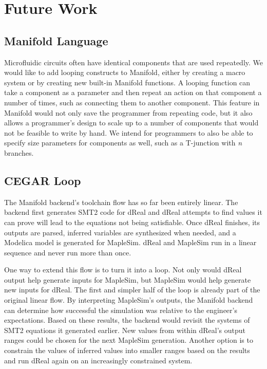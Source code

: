 \section{Future Work}

\subsection{Manifold Language}

Microfluidic circuits often have identical components that are used repeatedly.
We would like to add looping constructs to Manifold, either by creating a
macro system or by creating new built-in Manifold functions. A looping function
can take a component as a parameter and then repeat an action on that
component a number of times, such as connecting them to another component.
This feature in Manifold would not only save the programmer from repeating
code, but it also allows a programmer's design to scale up to a number of
components that would not be feasible to write by hand. We intend for
programmers to also be able to specify size parameters for components as
well, such as a T-junction with \emph{n} branches.

\subsection{CEGAR Loop}

The Manifold backend's toolchain flow has so far been entirely linear.
The backend first generates SMT2 code for dReal and dReal attempts to find values it can prove will lead to the equations not being satisfiable.
Once dReal finishes, its outputs are parsed, inferred variables are synthesized when needed, and a Modelica model is generated for MapleSim.
dReal and MapleSim run in a linear sequence and never run more than once.

One way to extend this flow is to turn it into a loop.
Not only would dReal output help generate inputs for MapleSim, but MapleSim would help generate new inputs for dReal.
The first and simpler half of the loop is already part of the original linear flow.
By interpreting MapleSim's outputs, the Manifold backend can determine how successful the simulation was relative to the engineer's expectations.
Based on these results, the backend would revisit the systems of SMT2 equations it generated earlier.
New values from within dReal's output ranges could be chosen for the next MapleSim generation.
Another option is to constrain the values of inferred values into smaller ranges based on the results and run dReal again on an increasingly constrained system.

